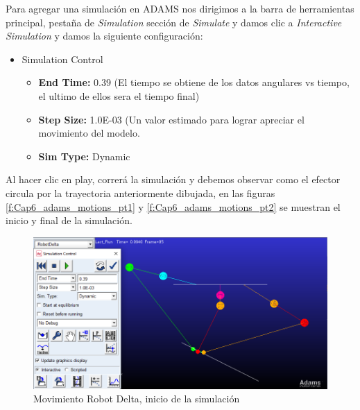     Para agregar una simulación en ADAMS nos dirigimos a la barra de herramientas principal, pestaña de \textit{Simulation} sección de \textit{Simulate} y damos clic a \textit{Interactive Simulation} y damos la siguiente configuración:
    
    \begin{scope}
        \renewcommand{\labelitemi}{\blacklozenge}
        \renewcommand{\labelitemii}{\checkmark}
        \begin{itemize}
            \item Simulation Control
            \begin{itemize}
                \item \textbf{End Time:} 0.39 (El tiempo se obtiene de los datos angulares vs tiempo, el ultimo de ellos sera el tiempo final)
                \item \textbf{Step Size:} 1.0E-03 (Un valor estimado para lograr apreciar el movimiento del modelo.
                \item \textbf{Sim Type:} Dynamic
            \end{itemize}
        \end{itemize}
    \end{scope}
    
    Al hacer clic en play, correrá la simulación y debemos observar como el efector circula por la trayectoria anteriormente dibujada, en las figuras \eqref{f:Cap6_adams_motions_pt1} y \eqref{f:Cap6_adams_motions_pt2} se muestran el inicio y final de la simulación.
    
    \begin{figure}[H]
        \centering
        \includegraphics[width=1\linewidth]{Main/Chapter6/Images6/adams/motions/simulacion_inicial.png}
        \caption{Movimiento Robot Delta, inicio de la simulación}
        \label{f:Cap6_adams_motions_pt1}
    \end{figure}
    
